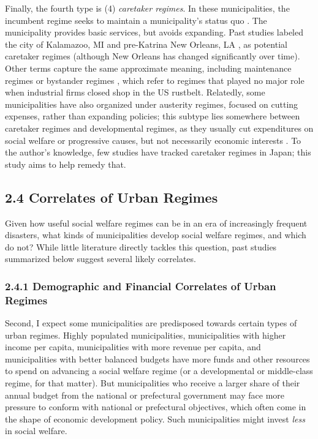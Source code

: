 \documentclass[preprint, 3p,
authoryear]{elsarticle} %
\begin{document}
Finally, the fourth type is (4) \emph{caretaker regimes}. In these
municipalities, the incumbent regime seeks to maintain a municipality's
status quo \citep{turner_1992, whelan_et_al_1994}. The municipality
provides basic services, but avoids expanding. Past studies labeled the
city of Kalamazoo, MI \citep{sanders_1987} and pre-Katrina New Orleans,
LA \citep{whelan_et_al_1994}, as potential caretaker regimes (although
New Orleans has changed significantly over time). Other terms capture
the same approximate meaning, including maintenance regimes
\citep{stone_1989} or bystander regimes \citep{portz_1990}, which refer
to regimes that played no major role when industrial firms closed shop
in the US rustbelt. Relatedly, some municipalities have also organized
under austerity regimes, focused on cutting expenses, rather than
expanding policies; this subtype lies somewhere between caretaker
regimes and developmental regimes, as they usually cut expenditures on
social welfare or progressive causes, but not necessarily economic
interests \citep{davies_and_blanco_2017}. To the author's knowledge, few
studies have tracked caretaker regimes in Japan; this study aims to help
remedy that.

\hypertarget{correlates-of-urban-regimes}{%
\subsection{2.4 Correlates of Urban
Regimes}\label{correlates-of-urban-regimes}}

Given how useful social welfare regimes can be in an era of increasingly
frequent disasters, what kinds of municipalities develop social welfare
regimes, and which do not? While little literature directly tackles this
question, past studies summarized below suggest several likely
correlates.

\hypertarget{demographic-and-financial-correlates-of-urban-regimes}{%
\subsubsection{2.4.1 Demographic and Financial Correlates of Urban
Regimes}\label{demographic-and-financial-correlates-of-urban-regimes}}

Second, I expect some municipalities are predisposed towards certain
types of urban regimes. Highly populated municipalities, municipalities
with higher income per capita, municipalities with more revenue per
capita, and municipalities with better balanced budgets have more funds
and other resources to spend on advancing a social welfare regime (or a
developmental or middle-class regime, for that matter). But
municipalities who receive a larger share of their annual budget from
the national or prefectural government may face more pressure to conform
with national or prefectural objectives, which often come in the shape
of economic development policy. Such municipalities might invest
\emph{less} in social welfare.
\end{document}
